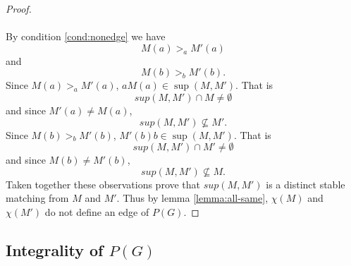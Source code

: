 \begin{proof}
\paragraph{}
By condition \ref{cond:nonedge} we have $$M(a)>_a M'(a)$$ and $$M(b) >_b M'(b).$$
Since $M(a) >_a M'(a)$, $aM(a) \in \sup(M,M')$. That is $$sup(M,M') \cap M \neq \emptyset$$ and since $M'(a) \neq M(a)$, 
$$sup(M,M') \not\subseteq M'.$$
Since $M(b) >_b M'(b)$, $M'(b)b \in \sup(M,M')$. That is $$sup(M,M') \cap M' \neq \emptyset$$ and since $M(b) \neq M'(b)$,
$$sup(M,M') \not\subseteq M.$$
Taken together these observations prove that $sup(M,M')$ is a distinct stable matching from $M$ and $M'$. Thus by lemma \ref{lemma:all-same}, $\chi(M)$ and $\chi(M')$ do not define an edge of $P(G)$.  
\end{proof}
\subsection{Integrality of $P(G)$}
